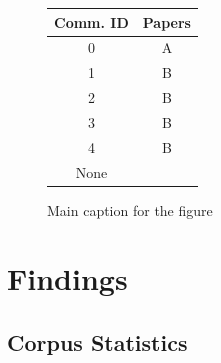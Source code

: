 \documentclass[manuscript,screen,review]{acmart}
\begin{document}
\begin{figure}
    \begin{tabular}{|c|c|}
        \hline
        Comm. ID & Papers \\
        \hline
        0 & A \\
        1 & B \\
        2 & B \\
        3 & B \\
        4 & B \\
        None & \\
        \hline
    \end{tabular}
    \caption{Main caption for the figure}
    \label{fig:corpus_table}
\end{figure}

\section{Findings} \label{sec:findings} 

\subsection{Corpus Statistics}
\end{document}
